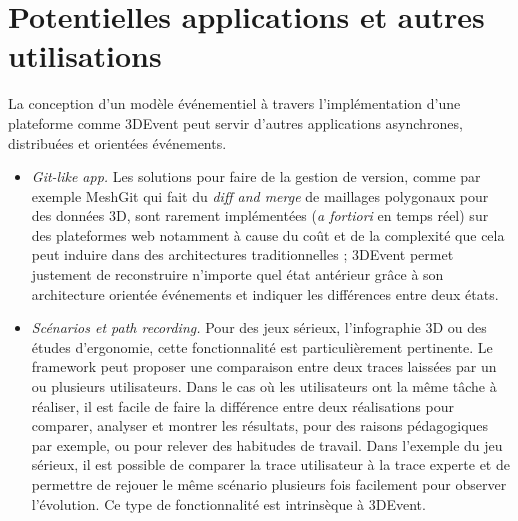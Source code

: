 \section{Potentielles applications et autres utilisations}
La conception d'un modèle événementiel à travers l'implémentation d'une plateforme 
comme 3DEvent peut servir d'autres applications 
asynchrones, distribuées et orientées événements.
\begin{itemize}
	\item \textit{Git-like app.} Les solutions pour faire de la gestion de version, comme 
	par exemple
 	Mesh\-Git \cite{Denning2013} qui fait du
	\textit{diff and merge} de maillages polygonaux pour des données \gls{3D}, 
	sont rarement implémentées (\textit{a fortiori} en 
	temps réel) sur des plateformes web notamment à cause du coût et de la complexité que 
	cela peut induire dans des architectures traditionnelles ; 3DEvent 
	permet justement de
	reconstruire n'importe quel état antérieur grâce à son architecture orientée 
	événements et indiquer les différences entre deux états.
	
	\item \textit{Scénarios et \textit{path recording}.} Pour des jeux sérieux, l'infographie 
	3D ou des études d'ergonomie, cette fonctionnalité est particulièrement 
	pertinente. Le \gls{framework} peut proposer une comparaison entre deux traces 
	laissées par un ou plusieurs utilisateurs. Dans le cas où les utilisateurs ont la 
	même tâche à réaliser, il est facile de faire la différence entre deux réalisations 
	pour comparer, analyser et montrer les résultats, pour des raisons 
	pédagogiques par exemple, ou pour relever des habitudes de travail. Dans 
	l'exemple du jeu sérieux, il est possible de comparer la trace utilisateur à la trace experte 
	et de permettre de rejouer le même scénario plusieurs fois facilement pour 
	observer l'évolution. Ce type de fonctionnalité est intrinsèque à 3DEvent. 
	

\end{itemize}

